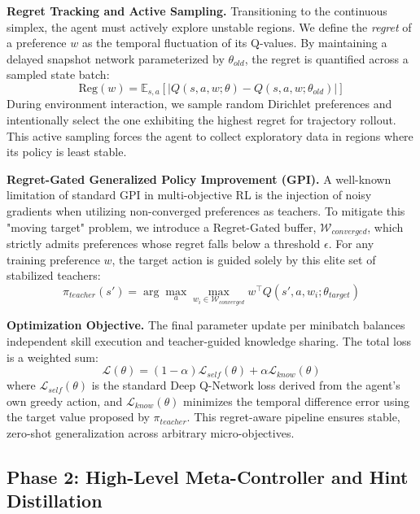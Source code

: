 \documentclass[conference]{IEEEtran}
\begin{document}
\textbf{Regret Tracking and Active Sampling.} Transitioning to the continuous simplex, the agent must actively explore unstable regions. We define the \textit{regret} of a preference $w$ as the temporal fluctuation of its Q-values. By maintaining a delayed snapshot network parameterized by $\theta_{old}$, the regret is quantified across a sampled state batch:
\begin{equation}
    \mathrm{Reg}(w) = \mathbb{E}_{s,a} \left[ \lvert Q(s, a, w; \theta) - Q(s, a, w; \theta_{old}) \rvert \right]
\end{equation}
During environment interaction, we sample random Dirichlet preferences and intentionally select the one exhibiting the highest regret for trajectory rollout. This active sampling forces the agent to collect exploratory data in regions where its policy is least stable.

\textbf{Regret-Gated Generalized Policy Improvement (GPI).} A well-known limitation of standard GPI in multi-objective RL is the injection of noisy gradients when utilizing non-converged preferences as teachers. To mitigate this "moving target" problem, we introduce a Regret-Gated buffer, $\mathcal{W}_{converged}$, which strictly admits preferences whose regret falls below a threshold $\epsilon$. For any training preference $w$, the target action is guided solely by this elite set of stabilized teachers:
\begin{equation}
    \pi_{teacher}(s') = \arg\max_{a} \max_{w_i \in \mathcal{W}_{converged}} w^{\top} Q(s', a, w_i; \theta_{target})
\end{equation}

\textbf{Optimization Objective.} The final parameter update per minibatch balances independent skill execution and teacher-guided knowledge sharing. The total loss is a weighted sum:
\begin{equation}
    \mathcal{L}(\theta) = (1 - \alpha)\mathcal{L}_{self}(\theta) + \alpha\mathcal{L}_{know}(\theta)
\end{equation}
where $\mathcal{L}_{self}(\theta)$ is the standard Deep Q-Network loss derived from the agent's own greedy action, and $\mathcal{L}_{know}(\theta)$ minimizes the temporal difference error using the target value proposed by $\pi_{teacher}$. This regret-aware pipeline ensures stable, zero-shot generalization across arbitrary micro-objectives.

\subsection{Phase 2: High-Level Meta-Controller and Hint Distillation}
\end{document}
